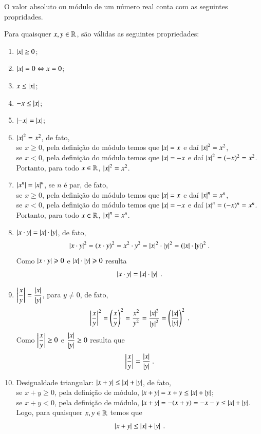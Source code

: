 O valor absoluto ou módulo de um número real conta com as seguintes propridades.

\begin{prop}
 Para quaisquer $x, y \in \mathbb{R}$, são válidas as seguintes propriedades: \label{prop.modulo}
\begin{enumerate}
 \item $\left|x\right| \geq 0$;
 \item $\left|x\right|= 0 \Leftrightarrow x= 0$;
 \item $x \leq \left|x\right|$;  
 \item $-x \leq \left|x\right|$;
 \item $\left|-x\right|= \left|x\right|$;
 \item $\left|x\right|^2= x^2$, de fato,\\ 
 se $x \geq 0$, pela definição do módulo temos que $\left|x\right|= x$ e daí $\left|x\right|^2= x^2$, \\
 se $x < 0$, pela definição do módulo temos que $\left|x\right|= -x$ e daí $\left|x\right|^2=(-x)^2= x^2$.\\
 Portanto, para todo $x \in \mathbb{R}$, $\left|x\right|^2= x^2$.
 
 \item $\left|x^n\right|= \left|x\right|^n$, se $n$ é par, de fato, \\
 se $x \geq 0$, pela definição do módulo temos que $\left|x\right|= x$ e daí $\left|x\right|^n= x^n$, \\
 se $x < 0$, pela definição do módulo temos que $\left|x\right|= -x$ e daí $\left|x\right|^n= (-x)^n= x^n$.\\
 Portanto, para todo $x \in \mathbb{R}$, $\left|x\right|^n= x^n$.

 \item $\left|x \cdot y\right|= \left|x\right| \cdot \left|y\right|$, de fato, \\
 \[\left|x \cdot y\right|^2= (x \cdot y)^2= x^2 \cdot y^2= \left|x\right|^2 \cdot \left|y\right|^2= (\left|x\right| \cdot \left|y\right|)^2 \ .\]
 Como $\left|x \cdot y\right| \geqslant 0$ e $\left|x\right| \cdot \left|y\right| \geqslant 0$ resulta
 \[\left|x \cdot y\right|= \left|x\right| \cdot \left|y\right| \ . \] 
 
 \item $\left|\dfrac{x}{y}\right|= \dfrac{\left|x\right|}{\left|y\right|}$, para $y \neq 0$, de fato, \\
 \[\left|\dfrac{x}{y}\right|^2= \left(\dfrac{x}{y} \right)^2= \dfrac{x^2}{y^2}= \dfrac{\left|x\right|^2}{\left|y\right|^2}= \left( \dfrac{\left|x\right|}{\left|y\right|} \right)^2 \ . \]
 Como $\left|\dfrac{x}{y}\right| \geq 0$ e $\dfrac{\left|x\right|}{\left|y\right|} \geq 0$ resulta que
 \[\left|\dfrac{x}{y}\right|= \dfrac{\left|x\right|}{\left|y\right|} \ .\]
 
 \item Desigualdade triangular: $\left|x+y\right|\leq \left|x\right|+\left|y\right|$, de fato, \\
 se $x + y \geqslant 0$, pela definição de módulo, $\left|x+y\right|= x+y \leq \left|x\right| + \left|y\right|$; \\ 
 se $x + y < 0$, pela definição de módulo, $\left|x+y\right|= -(x+y)= -x-y \leq \left|x\right| + \left|y\right|$. \\
 Logo, para quaisquer $x, y \in \mathbb{R}$ temos que
 \[\abs{x+y} \leq \abs{x}+\abs{y} \ .\] 
 

\end{enumerate}
\end{prop}
